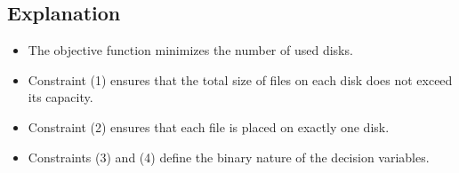 \documentclass{article}
\begin{document}
\subsection*{Explanation}
\begin{itemize}
    \item The objective function minimizes the number of used disks.
    \item Constraint (1) ensures that the total size of files on each disk does not exceed its capacity.
    \item Constraint (2) ensures that each file is placed on exactly one disk.
    \item Constraints (3) and (4) define the binary nature of the decision variables.
\end{itemize}
\end{document}
